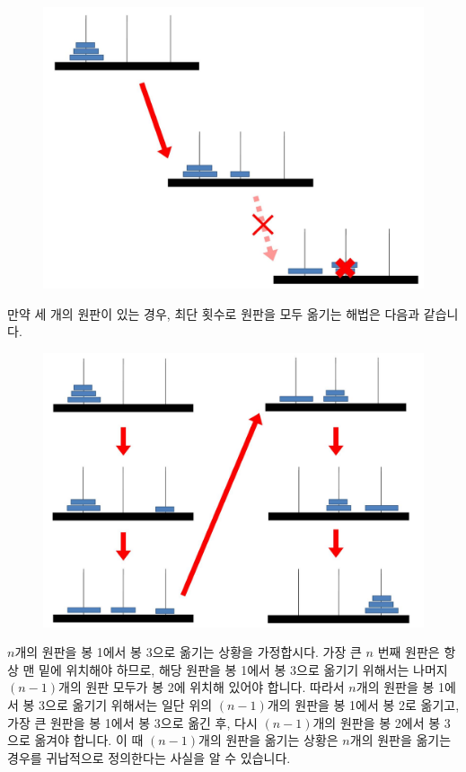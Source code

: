 \documentclass[../main.tex]{subfiles}
\begin{document}
\begin{figure}[H]
\centering
\includegraphics[width=0.7\linewidth]{"./lectures/lecture8_hanoi_rule"}
\label{fig:lecture8hanoirule}
\end{figure}

만약 세 개의 원판이 있는 경우, 최단 횟수로 원판을 모두 옮기는 해법은 다음과 같습니다.

\begin{figure}[H]
\centering
\includegraphics[width=0.7\linewidth]{"./lectures/lecture8_hanoi_3"}
\label{fig:lecture8hanoi3}
\end{figure}

$n$개의 원판을 봉 1에서 봉 3으로 옮기는 상황을 가정합시다.
가장 큰 $n$ 번째 원판은 항상 맨 밑에 위치해야 하므로, 해당 원판을 봉 1에서 봉 3으로 옮기기 위해서는 나머지 $(n - 1)$개의 원판 모두가 봉 2에 위치해 있어야 합니다.
따라서 $n$개의 원판을 봉 1에서 봉 3으로 옮기기 위해서는 일단 위의 $(n - 1)$개의 원판을 봉 1에서 봉 2로 옮기고, 가장 큰 원판을 봉 1에서 봉 3으로 옮긴 후, 다시 $(n - 1)$개의 원판을 봉 2에서 봉 3으로 옮겨야 합니다.
이 때 $(n - 1)$개의 원판을 옮기는 상황은 $n$개의 원판을 옮기는 경우를 귀납적으로 정의한다는 사실을 알 수 있습니다.
\end{document}
